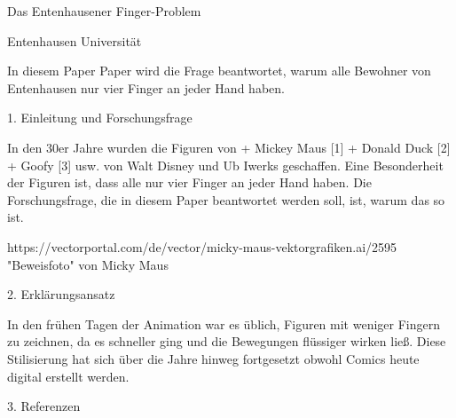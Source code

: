 \documentclass{article}
\begin{document}
Das Entenhausener Finger-Problem


Entenhausen Universität

In diesem Paper Paper wird die Frage beantwortet, warum alle Bewohner von 
Entenhausen nur vier Finger an jeder Hand haben.

1. Einleitung und Forschungsfrage

In den 30er Jahre wurden die Figuren von 
+ Mickey Maus [1]
+ Donald Duck  [2]
+ Goofy [3] usw. 
von Walt Disney und Ub Iwerks geschaffen. Eine Besonderheit der Figuren ist, 
dass alle nur vier Finger an jeder Hand haben. Die Forschungsfrage, die in 
diesem Paper beantwortet werden soll, ist, warum das so ist.

https://vectorportal.com/de/vector/micky-maus-vektorgrafiken.ai/2595
"Beweisfoto" von Micky Maus

2. Erklärungsansatz

In den frühen Tagen der Animation war es üblich, Figuren mit weniger Fingern zu 
zeichnen, da es schneller ging und die Bewegungen flüssiger wirken ließ. Diese 
Stilisierung hat sich über die Jahre hinweg fortgesetzt obwohl Comics heute digital 
erstellt werden.

3. Referenzen

\end{document}
